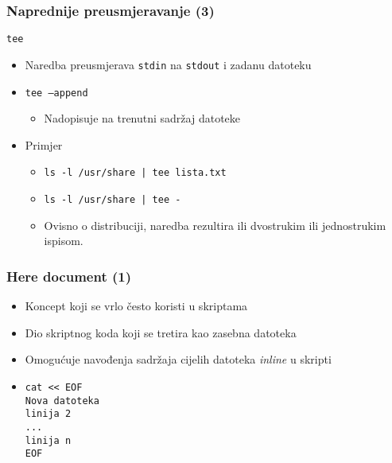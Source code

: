 \documentclass{beamer}
\newcommand{\shell}[1]{\texttt{#1}}
\begin{document}
\begin{frame}[t]
\frametitle{Naprednije preusmjeravanje (3)}
\shell{tee}
\begin{itemize}
	\item Naredba preusmjerava \shell{stdin} na \shell{stdout} i zadanu datoteku
	\item \shell{tee --append}
	\begin{itemize}
		\item Nadopisuje na trenutni sadržaj datoteke
	\end{itemize}
\end{itemize}
\begin{itemize}
	\item Primjer
	\begin{itemize}
		\item \shell{ls -l /usr/share | tee lista.txt}
		\item \shell{ls -l /usr/share | tee -}
		\item[] {\footnotesize Ovisno o distribuciji, naredba rezultira ili dvostrukim  ili jednostrukim ispisom.}
	\end{itemize}
\end{itemize}
\end{frame}

\begin{frame}[fragile]
\frametitle{Here document (1)}
\begin{itemize}
	\item Koncept koji se vrlo često koristi u skriptama
	\item Dio skriptnog koda koji se tretira kao zasebna datoteka
	\item Omogućuje navođenja sadržaja cijelih datoteka \textit{inline} u skripti
\end{itemize}
\begin{itemize}
\item[] \begin{verbatim}
cat << EOF
Nova datoteka
linija 2
...
linija n
EOF
\end{verbatim}
\end{itemize}
\end{frame}
\end{document}
